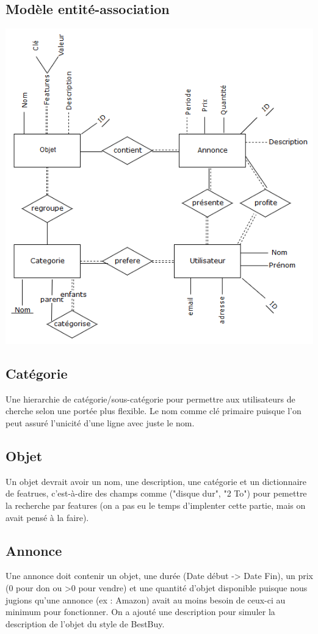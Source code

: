 \documentclass[a4paper,12pt]{article}
\begin{document}
	\begin{spacing}{1}
	\section*{Modèle entité-association}
	\includegraphics[scale=0.6]{modeleEA.png}
	\subsection*{Catégorie}
	Une hierarchie de catégorie/sous-catégorie pour permettre aux utilisateurs de cherche selon une portée plus flexible. Le nom comme clé primaire puisque l'on peut assuré l'unicité d'une ligne avec juste le nom.
	\subsection*{Objet}
	Un objet devrait avoir un nom, une description, une catégorie et un dictionnaire de featrues, c'est-à-dire des champs comme ("disque dur", "2 To") pour pemettre la recherche par features (on a pas eu le temps d'implenter cette partie, mais on avait pensé à la faire).
	\subsection*{Annonce}
	Une annonce doit contenir un objet, une durée (Date début -> Date Fin), un prix (0 pour don ou >0 pour vendre) et une quantité d'objet disponible puisque nous jugions qu'une annonce (ex : Amazon) avait au moins besoin de ceux-ci au minimum pour fonctionner. On a ajouté une description pour simuler la description de l'objet du style de BestBuy.

\end{spacing}
\end{document}
